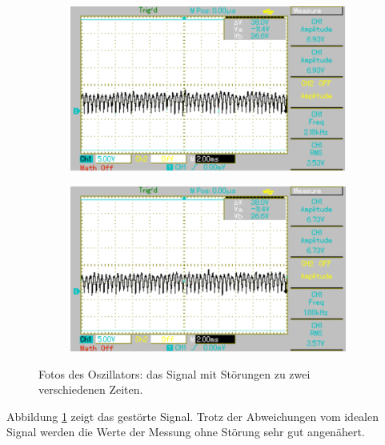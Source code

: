 \begin{figure}[htb]
	\centering
	\begin{subfigure}{0.49\textwidth}
		\includegraphics[width=\textwidth]{Bilder/MAP002.pdf}
	\end{subfigure}
	\begin{subfigure}{0.49\textwidth}
		\includegraphics[width=\textwidth]{Bilder/MAP003.pdf}
	\end{subfigure}
	\caption{Fotos des Oszillators: das Signal mit Störungen zu zwei verschiedenen Zeiten. \cite{gimp}}
	\label{fig:stoerung}
\end{figure}
Abbildung \ref{fig:stoerung} zeigt das gestörte Signal. 
Trotz der Abweichungen vom idealen Signal werden die Werte der Messung ohne Störung sehr gut angenähert.

